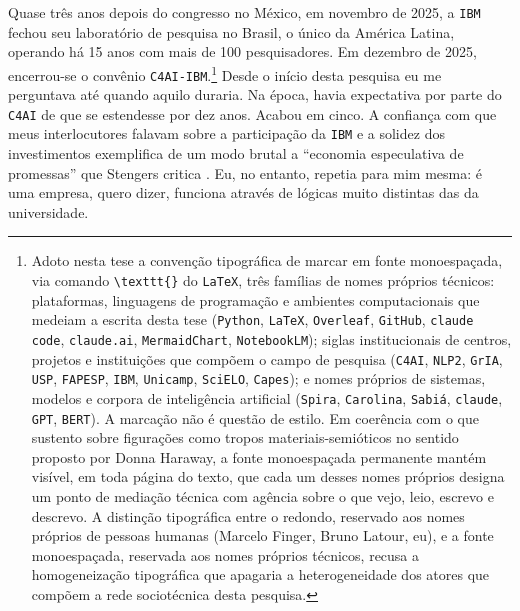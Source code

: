 Quase três anos depois do congresso no México, em novembro de 2025, a \texttt{IBM} fechou seu laboratório de pesquisa no Brasil, o único da América Latina, operando há 15 anos com mais de 100 pesquisadores. Em dezembro de 2025, encerrou-se o convênio \texttt{C4AI-IBM}.\footnote{Adoto nesta tese a convenção tipográfica de marcar em fonte monoespaçada, via comando \texttt{\textbackslash texttt\{\}} do \texttt{LaTeX}, três famílias de nomes próprios técnicos: plataformas, linguagens de programação e ambientes computacionais que medeiam a escrita desta tese (\texttt{Python}, \texttt{LaTeX}, \texttt{Overleaf}, \texttt{GitHub}, \texttt{claude code}, \texttt{claude.ai}, \texttt{MermaidChart}, \texttt{NotebookLM}); siglas institucionais de centros, projetos e instituições que compõem o campo de pesquisa (\texttt{C4AI}, \texttt{NLP2}, \texttt{GrIA}, \texttt{USP}, \texttt{FAPESP}, \texttt{IBM}, \texttt{Unicamp}, \texttt{SciELO}, \texttt{Capes}); e nomes próprios de sistemas, modelos e corpora de inteligência artificial (\texttt{Spira}, \texttt{Carolina}, \texttt{Sabiá}, \texttt{claude}, \texttt{GPT}, \texttt{BERT}). A marcação não é questão de estilo. Em coerência com o que sustento sobre figurações como tropos materiais-semióticos no sentido proposto por Donna Haraway, a fonte monoespaçada permanente mantém visível, em toda página do texto, que cada um desses nomes próprios designa um ponto de mediação técnica com agência sobre o que vejo, leio, escrevo e descrevo. A distinção tipográfica entre o redondo, reservado aos nomes próprios de pessoas humanas (Marcelo Finger, Bruno Latour, eu), e a fonte monoespaçada, reservada aos nomes próprios técnicos, recusa a homogeneização tipográfica que apagaria a heterogeneidade dos atores que compõem a rede sociotécnica desta pesquisa.} Desde o início desta pesquisa eu me perguntava até quando aquilo duraria. Na época, havia expectativa por parte do \texttt{C4AI} de que se estendesse por dez anos. Acabou em cinco. A confiança com que meus interlocutores falavam sobre a participação da \texttt{IBM} e a solidez dos investimentos exemplifica de um modo brutal a ``economia especulativa de promessas'' que Stengers critica \parencite{stengers2018another}. Eu, no entanto, repetia para mim mesma: é uma empresa, quero dizer, funciona através de lógicas muito distintas das da universidade. 

